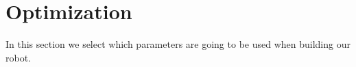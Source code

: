 \section{Optimization}
In this section we select which parameters are going to be used when building our robot.





